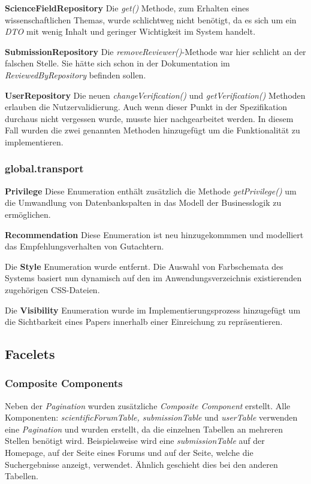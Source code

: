 \textbf{ScienceFieldRepository} Die \emph{get()} Methode,
zum Erhalten eines wissenschaftlichen Themas, wurde schlichtweg nicht benötigt,
da es sich um ein \emph{DTO} mit wenig Inhalt und geringer Wichtigkeit im System handelt.

\textbf{SubmissionRepository} Die \emph{removeReviewer()}-Methode war hier schlicht an
der falschen Stelle. Sie hätte sich schon in der Dokumentation im \emph{ReviewedByRepository}
befinden sollen.

\textbf{UserRepository} Die neuen \emph{changeVerification()} und \emph{getVerification()}
Methoden erlauben die Nutzervalidierung. Auch wenn dieser Punkt in der Spezifikation durchaus nicht
vergessen wurde, musste hier nachgearbeitet werden. In diesem Fall wurden die zwei genannten Methoden
hinzugefügt um die Funktionalität zu implementieren.

\subsubsection{global.transport}

\textbf{Privilege} Diese Enumeration enthält zusätzlich die Methode \emph{getPrivilege()}
um die Umwandlung von Datenbankspalten in das Modell der Businesslogik zu ermöglichen.

\textbf{Recommendation} Diese Enumeration ist neu hinzugekommmen und modelliert
das Empfehlungsverhalten von Gutachtern.

Die \textbf{Style} Enumeration wurde entfernt. Die Auswahl von Farbschemata des
Systems basiert nun dynamisch auf den im Anwendungsverzeichnis existierenden zugehörigen
CSS-Dateien.

Die \textbf{Visibility} Enumeration wurde im Implementierungsprozess hinzugefügt um die Sichtbarkeit eines
Papers innerhalb einer Einreichung zu repräsentieren.

\subsection{Facelets}

\subsubsection{Composite Components}

Neben der \emph{Pagination} wurden zusätzliche \emph{Composite Component} erstellt. Alle Komponenten: \emph{scientificForumTable, submissionTable} und \emph{userTable} verwenden eine  \emph{Pagination} und wurden erstellt, da die einzelnen Tabellen an mehreren Stellen benötigt wird. Beispielsweise wird eine \emph{submissionTable} auf der Homepage, auf der Seite eines Forums und auf der Seite, welche die Suchergebnisse anzeigt, verwendet. Ähnlich geschieht dies bei den anderen Tabellen.

